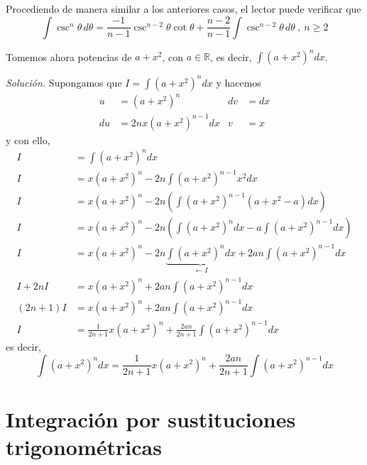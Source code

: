 \begin{ejemplo}
Procediendo de manera similar a los anteriores casos, el lector puede verificar que
\[
  \int \csc ^{n}\theta\,d\theta=\frac{-1}{n-1}\csc ^{n-2}\theta \cot \theta +\frac{n-2}{n-1}\int \csc ^{n-2}\theta\,d\theta\ ,\ n\geq 2
\]
\end{ejemplo}

\begin{ejemplo}
Tomemos ahora potencias de $a+x^{2}$, con $a\in\mathbb{R}$, es decir, $\int \left( a+x^{2}\right)^{n}dx $.
\end{ejemplo}
\emph{Solución.} Supongamos que $I=\int \left( a+x^{2}\right)^{n}dx $ y hacemos
\begin{align*}
u&=\left( a+x^{2}\right)^{n} & dv&=dx \\
du&=2nx\left( a+x^{2}\right) ^{n-1}dx & v&=x
\end{align*}
y con ello,
\begin{align*}
I&= \int \left( a+x^{2}\right) ^{n}dx \\
I&=x\left( a+x^{2}\right) ^{n}-2n\int \left( a+x^{2}\right) ^{n-1}x^{2}dx\\
I&=x\left( a+x^{2}\right) ^{n}-2n\left( \int \left( a+x^{2}\right)
^{n-1}\left( a+x^{2}-a\right) dx\right) \\
I&=x\left( a+x^{2}\right) ^{n}-2n\left( \int \left( a+x^{2}\right)
^{n}dx-a\int \left( a+x^{2}\right) ^{n-1}dx\right) \\
I&=x\left( a+x^{2}\right) ^{n}-2n\underbrace{\int \left(
a+x^{2}\right)^{n}dx}_{\leftarrow I}+2an\int \left( a+x^{2}\right) ^{n-1}dx\\
I+2nI&=x\left( a+x^{2}\right) ^{n}+2an\int \left( a+x^{2}\right) ^{n-1}dx\\
\left( 2n+1\right) I&=x\left( a+x^{2}\right) ^{n}+2an\int \left(
a+x^{2}\right) ^{n-1}dx\\
I&=\frac{1}{2n+1}x\left( a+x^{2}\right)
^{n}+\frac{2an}{2n+1}\int \left( a+x^{2}\right) ^{n-1}dx
\end{align*}
es decir,
\[
\int \left( a+x^{2}\right) ^{n}dx=\frac{1}{2n+1}x\left( a+x^{2}\right)
^{n}+\frac{2an}{2n+1}\int \left( a+x^{2}\right) ^{n-1}dx
\]

\section{Integración por sustituciones trigonométricas}

